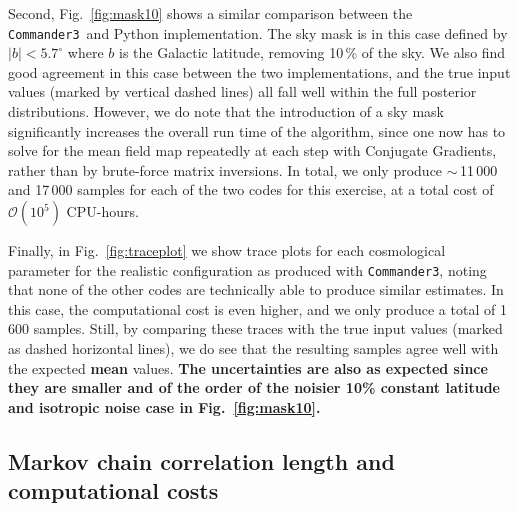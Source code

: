 \documentclass[twocolumn]{aa}
\def\commanderthree{\texttt{Commander3}}
\begin{document}
Second, Fig.~\ref{fig:mask10} shows a similar comparison between the \commanderthree\ and Python implementation. The sky mask is in this case defined by $|b|<5.7^{\circ}$ where $b$ is the Galactic latitude, removing 10\,\% of the sky. We also find good agreement in this case between the two implementations, and the true input values (marked by vertical dashed lines) all fall well within the full posterior distributions. However, we do note that the introduction of a sky mask significantly increases the overall run time of the algorithm, since one now has to solve for the mean field map repeatedly at each step with Conjugate Gradients, rather than by brute-force matrix inversions. In total, we only produce $\sim$\,11\,000 and 17\,000 samples for each of the two codes for this exercise, at a total cost of $\mathcal{O}(10^5)$ CPU-hours.

Finally, in Fig.~\ref{fig:traceplot} we show trace plots for each cosmological parameter for the realistic configuration as produced with \commanderthree, noting that none of the other codes are technically able to produce similar estimates. In this case, the computational cost is even higher, and we only produce a total of 1\,600 samples. Still, by comparing these traces with the true input values (marked as dashed horizontal lines), we do see that the resulting samples agree well with the expected \textbf{mean} values. \textbf{The uncertainties are  also as expected since they are smaller and of the order of the noisier 10\% constant latitude and isotropic noise case in Fig.~\ref{fig:mask10}.}

\subsection{Markov chain correlation length and computational costs}
\label{sec:resources}
\end{document}
